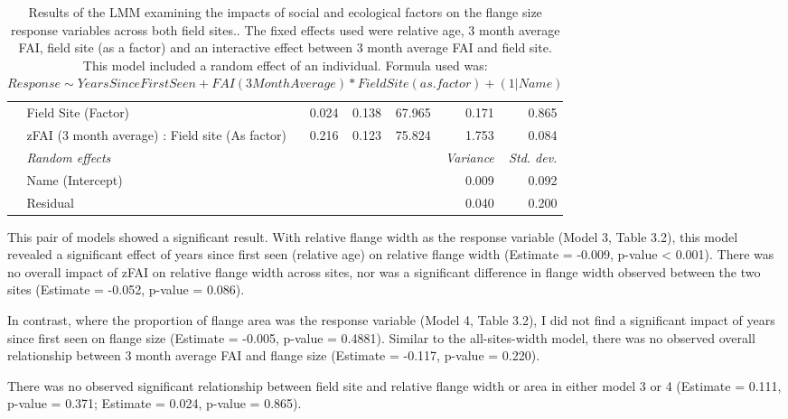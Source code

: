 \begin{table}
{\begin{tabular}{l l r r r r r}
    & Field Site (Factor) & 0.024 & 0.138 & 67.965 & 0.171 &  0.865\\

    & zFAI (3 month average) : Field site (As factor) & 0.216 & 0.123 & 75.824 & 1.753 &  0.084\\
    \cline{2-7}
        & \textit{Random effects} & & & & \textit{Variance} & \textit{Std. dev.}\\
    \cline{2-7} 
    & Name (Intercept) & & & & 0.009 & 0.092 \\
    & Residual & & & & 0.040 & 0.200 \\
     \hline 
\end{tabular}
    }
    \caption{Results of the LMM examining the impacts of social and ecological factors on the flange size response variables across both field sites.. The fixed effects used were relative age, 3 month average FAI, field site (as a factor) and an interactive effect between 3 month average FAI and field site. This model included a random effect of an individual.
    Formula used was: \(Response \sim YearsSinceFirstSeen + FAI (3MonthAverage) * FieldSite (as.factor) + (1 | Name)\) }
\end{table}
This pair of models showed a significant result. With relative flange width as the response variable (Model 3, Table 3.2), this model revealed a significant effect of years since first seen (relative age) on relative flange width (Estimate = -0.009, p-value < 0.001). 
There was no overall impact of zFAI on relative flange width across sites, nor was a significant difference in flange width observed between the two sites (Estimate = -0.052, p-value = 0.086).

In contrast, where the proportion of flange area was the response variable (Model 4, Table 3.2), I did not find a significant impact of years since first seen on flange size (Estimate = -0.005, p-value = 0.4881). Similar to the all-sites-width model, there was no observed overall relationship between 3 month average FAI and flange size (Estimate = -0.117, p-value = 0.220).

There was no observed significant relationship between field site and relative flange width or area in either model 3 or 4 (Estimate = 0.111, p-value = 0.371; Estimate = 0.024, p-value = 0.865).

